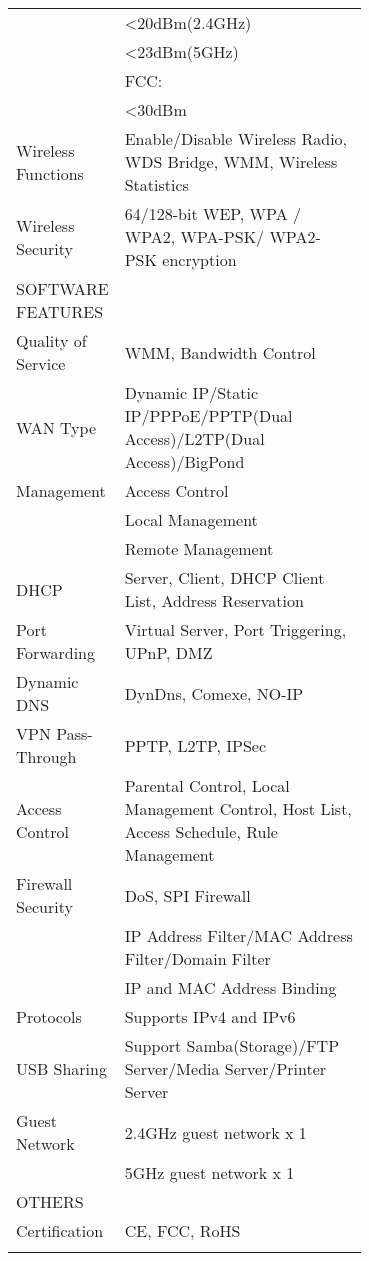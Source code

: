 \begin{longtable}{lp{0.7\linewidth}}
																		& \textless20dBm(2.4GHz)\\
																		& \textless23dBm(5GHz) \\
																		& FCC:\\
																		& \textless30dBm \\
		Wireless Functions 		 		 		 		 		 & Enable/Disable Wireless Radio, WDS Bridge, WMM, Wireless Statistics \\
		Wireless Security 		 		 		 		 		 & 64/128-bit WEP, WPA / WPA2, WPA-PSK/ WPA2-PSK encryption \\ \hline
		SOFTWARE FEATURES 		 		 		 		 		 & \\
		Quality of Service 		 		 		 		 		 & WMM, Bandwidth Control \\
		WAN Type 		 		 		 		 		 & Dynamic IP/Static IP/PPPoE/PPTP(Dual Access)/L2TP(Dual Access)/BigPond \\
		Management 		 		 		 		 		 & Access Control\\
																	& Local Management\\
																	& Remote Management \\
		DHCP 		 		 		 		 		 & Server, Client, DHCP Client List, Address Reservation \\
		Port Forwarding 		 		 		 		 		 & Virtual Server, Port Triggering, UPnP, DMZ \\
		Dynamic DNS 		 		 		 		 		 & DynDns, Comexe, NO-IP \\
		VPN Pass-Through 		 		 		 		 		 & PPTP, L2TP, IPSec \\
		Access Control 		 		 		 		 		 & Parental Control, Local Management Control, Host List, Access Schedule, Rule Management \\
		Firewall Security 		 		 		 		 		 & DoS, SPI Firewall\\
																		& IP Address Filter/MAC Address Filter/Domain Filter\\
																		& IP and MAC Address Binding \\
		Protocols 		 		 		 		 		 & Supports IPv4 and IPv6 \\
		USB Sharing 		 		 		 		 		 & Support Samba(Storage)/FTP Server/Media Server/Printer Server \\
		Guest Network 		 		 		 		 		 & 2.4GHz guest network x 1 \\
																		& 5GHz guest network x 1 \\ \hline
		OTHERS 		 		 		 		 		 & \\
		Certification 		 		 		 		 		 & CE, FCC, RoHS \\ \hline
		\label{tab:tplink-ac1750}
\end{longtable}

